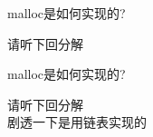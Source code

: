 \begin{frame}[fragile]{malloc是如何实现的?}
    \begin{center}
        请听下回分解
    \end{center}
\end{frame}

\begin{frame}[fragile]{malloc是如何实现的?}
    \begin{center}
        请听下回分解 \\
        \tiny 剧透一下是用链表实现的
    \end{center}
\end{frame}
